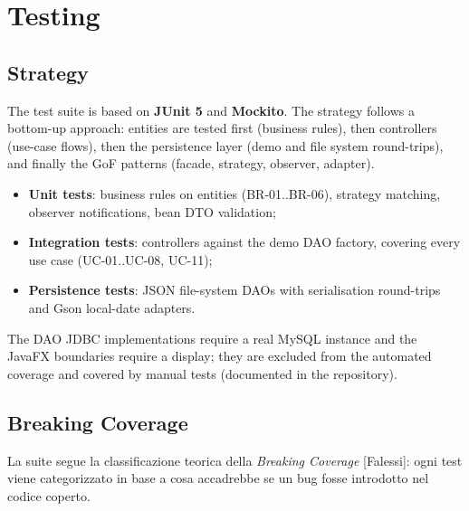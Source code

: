 \chapter{Testing}\label{ch:testing}

\section{Strategy}

The test suite is based on \textbf{JUnit 5} and \textbf{Mockito}. The strategy
follows a bottom-up approach: entities are tested first (business rules),
then controllers (use-case flows), then the persistence layer (demo and file
system round-trips), and finally the GoF patterns (facade, strategy, observer,
adapter).

\begin{itemize}
    \item \textbf{Unit tests}: business rules on entities (BR-01..BR-06),
    strategy matching, observer notifications, bean DTO validation;
    \item \textbf{Integration tests}: controllers against the demo DAO
    factory, covering every use case (UC-01..UC-08, UC-11);
    \item \textbf{Persistence tests}: JSON file-system DAOs with
    serialisation round-trips and Gson local-date adapters.
\end{itemize}

The DAO JDBC implementations require a real MySQL instance and the JavaFX
boundaries require a display; they are excluded from the automated coverage
and covered by manual tests (documented in the repository).

\section{Breaking Coverage}

La suite segue la classificazione teorica della \emph{Breaking Coverage}
[Falessi]: ogni test viene categorizzato in base a cosa accadrebbe se un bug
fosse introdotto nel codice coperto.


